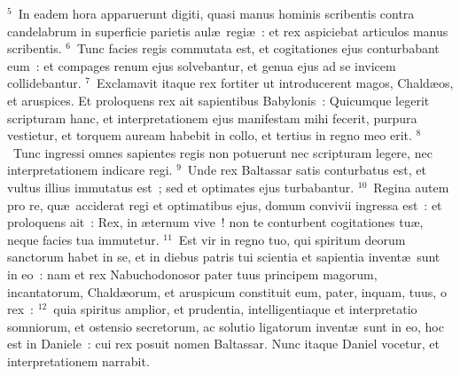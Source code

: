 ${}^{5}$~In eadem hora apparuerunt digiti, quasi manus hominis scribentis contra candelabrum in superficie parietis aul\ae\ regi\ae~: et rex aspiciebat articulos manus scribentis.
${}^{6}$~Tunc facies regis commutata est, et cogitationes ejus conturbabant eum~: et compages renum ejus solvebantur, et genua ejus ad se invicem collidebantur.
${}^{7}$~Exclamavit itaque rex fortiter ut introducerent magos, Chald\ae os, et aruspices. Et proloquens rex ait sapientibus Babylonis~: Quicumque legerit scripturam hanc, et interpretationem ejus manifestam mihi fecerit, purpura vestietur, et torquem auream habebit in collo, et tertius in regno meo erit.
${}^{8}$~Tunc ingressi omnes sapientes regis non potuerunt nec scripturam legere, nec interpretationem indicare regi.
${}^{9}$~Unde rex Baltassar satis conturbatus est, et vultus illius immutatus est~; sed et optimates ejus turbabantur.
${}^{10}$~Regina autem pro re, qu\ae\ acciderat regi et optimatibus ejus, domum convivii ingressa est~: et proloquens ait~: Rex, in \ae ternum vive~! non te conturbent cogitationes tu\ae , neque facies tua immutetur.
${}^{11}$~Est vir in regno tuo, qui spiritum deorum sanctorum habet in se, et in diebus patris tui scientia et sapientia invent\ae\ sunt in eo~: nam et rex Nabuchodonosor pater tuus principem magorum, incantatorum, Chald\ae orum, et aruspicum constituit eum, pater, inquam, tuus, o rex~:
${}^{12}$~quia spiritus amplior, et prudentia, intelligentiaque et interpretatio somniorum, et ostensio secretorum, ac solutio ligatorum invent\ae\ sunt in eo, hoc est in Daniele~: cui rex posuit nomen Baltassar. Nunc itaque Daniel vocetur, et interpretationem narrabit.


